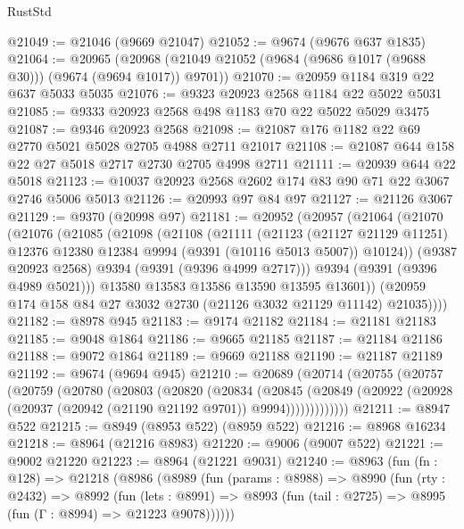 \begin{lexlean}{RustStd}
\begin{coremodule}
@21049 := @21046 (@9669 @21047)
@21052 := @9674 (@9676 @637 @1835)
@21064 := @20965
    (@20968 (@21049 @21052 (@9684 (@9686 @1017 (@9688 @30))) (@9674 (@9694 @1017)) @9701))
@21070 := @20959 @1184 @319 @22 @637 @5033 @5035
@21076 := @9323 @20923 @2568 @1184 @22 @5022 @5031
@21085 := @9333 @20923 @2568 @498 @1183 @70 @22 @5022 @5029 @3475
@21087 := @9346 @20923 @2568
@21098 := @21087 @176 @1182 @22 @69 @2770 @5021 @5028 @2705 @4988 @2711 @21017
@21108 := @21087 @644 @158 @22 @27 @5018 @2717 @2730 @2705 @4998 @2711
@21111 := @20939 @644 @22 @5018
@21123 := @10037 @20923 @2568 @2602 @174 @83 @90 @71 @22 @3067 @2746 @5006 @5013
@21126 := @20993 @97 @84 @97
@21127 := @21126 @3067
@21129 := @9370 (@20998 @97)
@21181 := @20952
    (@20957
      (@21064
        (@21070
          (@21076
            (@21085
              (@21098
                (@21108
                  (@21111
                    (@21123
                      (@21127 @21129 @11251)
                      @12376
                      @12380
                      @12384
                      @9994
                      (@9391 (@10116 @5013 @5007))
                      @10124))
                  (@9387 @20923 @2568)
                  @9394
                  (@9391 (@9396 @4999 @2717)))
                @9394
                (@9391 (@9396 @4989 @5021)))
              @13580
              @13583
              @13586
              @13590
              @13595
              @13601))
          (@20959 @174 @158 @84 @27 @3032 @2730 (@21126 @3032 @21129 @11142) @21035))))
@21182 := @8978 @945
@21183 := @9174 @21182
@21184 := @21181 @21183
@21185 := @9048 @1864
@21186 := @9665 @21185
@21187 := @21184 @21186
@21188 := @9072 @1864
@21189 := @9669 @21188
@21190 := @21187 @21189
@21192 := @9674 (@9694 @945)
@21210 := @20689
    (@20714
      (@20755
        (@20757
          (@20759
            (@20780
              (@20803
                (@20820
                  (@20834
                    (@20845
                      (@20849
                        (@20922 (@20928 (@20937 (@20942 (@21190 @21192 @9701)) @9994)))))))))))))
@21211 := @8947 @522
@21215 := @8949 (@8953 @522) (@8959 @522)
@21216 := @8968 @16234
@21218 := @8964 (@21216 @8983)
@21220 := @9006 (@9007 @522)
@21221 := @9002 @21220
@21223 := @8964 (@21221 @9031)
@21240 := @8963
    (fun (fn : @128) =>
    @21218
      (@8986
        (@8989
          (fun (params : @8988) =>
          @8990
            (fun (rty : @2432) =>
            @8992
              (fun (lets : @8991) =>
              @8993 (fun (tail : @2725) => @8995 (fun (Γ : @8994) => @21223 @9078))))))

\end{coremodule}
\end{lexlean}
